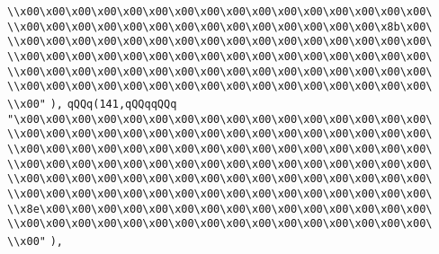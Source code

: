 \verb|\\x00\x00\x00\x00\x00\x00\x00\x00\x00\x00\x00\x00\x00\x00\x00\x00\|\newline
\verb|\\x00\x00\x00\x00\x00\x00\x00\x00\x00\x00\x00\x00\x00\x00\x8b\x00\|\newline
\verb|\\x00\x00\x00\x00\x00\x00\x00\x00\x00\x00\x00\x00\x00\x00\x00\x00\|\newline
\verb|\\x00\x00\x00\x00\x00\x00\x00\x00\x00\x00\x00\x00\x00\x00\x00\x00\|\newline
\verb|\\x00\x00\x00\x00\x00\x00\x00\x00\x00\x00\x00\x00\x00\x00\x00\x00\|\newline
\verb|\\x00\x00\x00\x00\x00\x00\x00\x00\x00\x00\x00\x00\x00\x00\x00\x00\|\newline
\verb|\\x00"|\newline
\verb|),|\newline
\verb|qQQq(141,qQQqqQQq|\newline
\verb|"\x00\x00\x00\x00\x00\x00\x00\x00\x00\x00\x00\x00\x00\x00\x00\x00\|\newline
\verb|\\x00\x00\x00\x00\x00\x00\x00\x00\x00\x00\x00\x00\x00\x00\x00\x00\|\newline
\verb|\\x00\x00\x00\x00\x00\x00\x00\x00\x00\x00\x00\x00\x00\x00\x00\x00\|\newline
\verb|\\x00\x00\x00\x00\x00\x00\x00\x00\x00\x00\x00\x00\x00\x00\x00\x00\|\newline
\verb|\\x00\x00\x00\x00\x00\x00\x00\x00\x00\x00\x00\x00\x00\x00\x00\x00\|\newline
\verb|\\x00\x00\x00\x00\x00\x00\x00\x00\x00\x00\x00\x00\x00\x00\x00\x00\|\newline
\verb|\\x8e\x00\x00\x00\x00\x00\x00\x00\x00\x00\x00\x00\x00\x00\x00\x00\|\newline
\verb|\\x00\x00\x00\x00\x00\x00\x00\x00\x00\x00\x00\x00\x00\x00\x00\x00\|\newline
\verb|\\x00"|\newline
\verb|),|\newline
